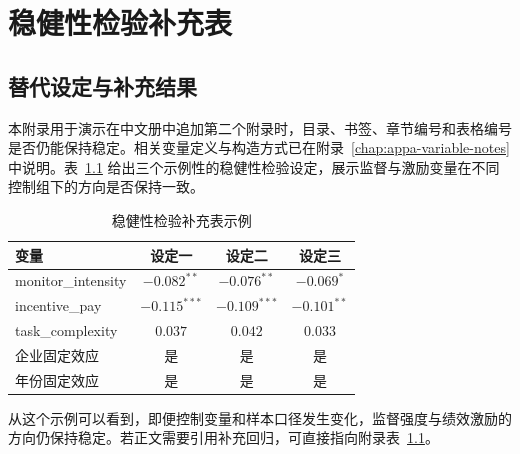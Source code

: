 \chapter{稳健性检验补充表}
\label{chap:appb-robustness-tables}

\section{替代设定与补充结果}
\label{sec:appb-alternative-specifications}

本附录用于演示在中文册中追加第二个附录时，目录、书签、章节编号和表格编号是否仍能保持稳定。相关变量定义与构造方式已在附录~\ref{chap:appa-variable-notes} 中说明。表~\ref{tab:appb-robustness} 给出三个示例性的稳健性检验设定，展示监督与激励变量在不同控制组下的方向是否保持一致。

\begin{table}[htbp]
    \centering
    \caption{稳健性检验补充表示例}
    \label{tab:appb-robustness}
    \begin{tabular}{lccc}
        \toprule
        变量 & 设定一 & 设定二 & 设定三 \\
        \midrule
        monitor\_intensity & $-0.082^{**}$ & $-0.076^{**}$ & $-0.069^{*}$ \\
        incentive\_pay & $-0.115^{***}$ & $-0.109^{***}$ & $-0.101^{**}$ \\
        task\_complexity & $0.037$ & $0.042$ & $0.033$ \\
        企业固定效应 & 是 & 是 & 是 \\
        年份固定效应 & 是 & 是 & 是 \\
        \bottomrule
    \end{tabular}
\end{table}

从这个示例可以看到，即便控制变量和样本口径发生变化，监督强度与绩效激励的方向仍保持稳定。若正文需要引用补充回归，可直接指向附录表~\ref{tab:appb-robustness}。
